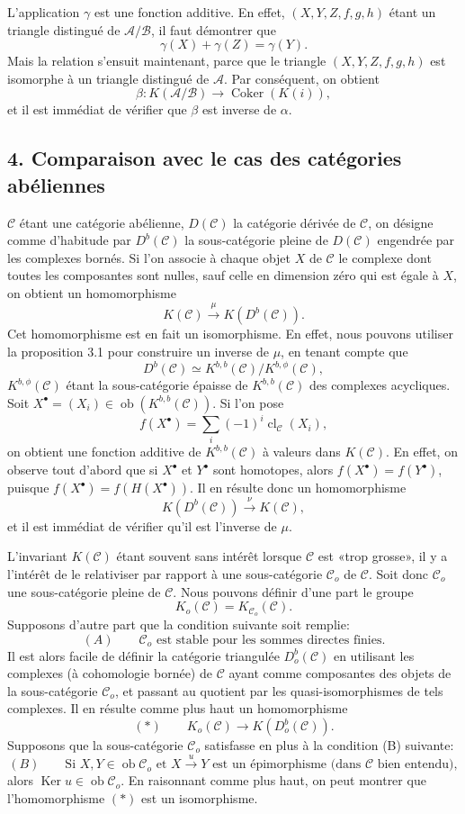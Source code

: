 \documentclass[11pt]{article}
\providecommand{\Ob}{\operatorname{ob}}
\providecommand{\cC}{\mathcal C}
\providecommand{\Ob}{\operatorname{ob}}
\providecommand{\cC}{\mathcal C}
\providecommand{\cA}{\mathcal A}
\providecommand{\cB}{\mathcal B}
\providecommand{\Ob}{\operatorname{Ob}}
\providecommand{\Ob}{\operatorname{ob}}
\providecommand{\Ob}{\operatorname{Ob}}
\begin{document}
L'application $\gamma$ est une fonction additive. En effet, $(X,Y,Z,f,g,h)$ étant un triangle distingué de $\cA/\cB$, il faut démontrer que
\[
\gamma(X)+\gamma(Z)=\gamma(Y).
\]
Mais la relation s'ensuit maintenant, parce que le triangle $(X,Y,Z,f,g,h)$ est isomorphe à un triangle distingué de $\cA$. Par conséquent, on obtient
\[
\beta:K(\cA/\cB)\longrightarrow \operatorname{Coker}(K(i)),
\]
et il est immédiat de vérifier que $\beta$ est inverse de $\alpha$.

\subsection*{4. Comparaison avec le cas des catégories abéliennes}

$\cC$ étant une catégorie abélienne, $D(\cC)$ la catégorie dérivée de $\cC$, on désigne comme d'habitude par $D^b(\cC)$ la sous-catégorie pleine de $D(\cC)$ engendrée par les complexes bornés. Si l'on associe à chaque objet $X$ de $\cC$ le complexe dont toutes les composantes sont nulles, sauf celle en dimension zéro qui est égale à $X$, on obtient un homomorphisme
\[
K(\cC)\xrightarrow{\mu}K(D^b(\cC)).
\]
Cet homomorphisme est en fait un isomorphisme. En effet, nous pouvons utiliser la proposition 3.1 pour construire un inverse de $\mu$, en tenant compte que
\[
D^b(\cC)\simeq K^{b,b}(\cC)/K^{b,\phi}(\cC),
\]
$K^{b,\phi}(\cC)$ étant la sous-catégorie épaisse de $K^{b,b}(\cC)$ des complexes acycliques. Soit $X^\bullet=(X_i)\in\Ob(K^{b,b}(\cC))$. Si l'on pose
\[
f(X^\bullet)=\sum_i(-1)^i\operatorname{cl}_{\cC}(X_i),
\]
on obtient une fonction additive de $K^{b,b}(\cC)$ à valeurs dans $K(\cC)$. En effet, on observe tout d'abord que si $X^\bullet$ et $Y^\bullet$ sont homotopes, alors $f(X^\bullet)=f(Y^\bullet)$, puisque $f(X^\bullet)=f(H(X^\bullet))$. Il en résulte donc un homomorphisme
\[
K(D^b(\cC))\xrightarrow{\nu}K(\cC),
\]
et il est immédiat de vérifier qu'il est l'inverse de $\mu$.

L'invariant $K(\cC)$ étant souvent sans intérêt lorsque $\cC$ est «trop grosse», il y a l'intérêt de le relativiser par rapport à une sous-catégorie $\cC_o$ de $\cC$. Soit donc $\cC_o$ une sous-catégorie pleine de $\cC$. Nous pouvons définir d'une part le groupe
\[
K_o(\cC)=K_{\cC_o}(\cC).
\]
Supposons d'autre part que la condition suivante soit remplie:
\[
(A)\qquad \cC_o\text{ est stable pour les sommes directes finies.}
\]
Il est alors facile de définir la catégorie triangulée $D_o^b(\cC)$ en utilisant les complexes (à cohomologie bornée) de $\cC$ ayant comme composantes des objets de la sous-catégorie $\cC_o$, et passant au quotient par les quasi-isomorphismes de tels complexes. Il en résulte comme plus haut un homomorphisme
\[
(*)\qquad K_o(\cC)\longrightarrow K(D_o^b(\cC)).
\]
Supposons que la sous-catégorie $\cC_o$ satisfasse en plus à la condition (B) suivante:
\[
(B)\qquad
\text{Si }X,Y\in\Ob\cC_o\text{ et }X\xrightarrow{u}Y
\text{ est un épimorphisme (dans }\cC\text{ bien entendu)},
\]
alors $\operatorname{Ker}u\in\Ob\cC_o$. En raisonnant comme plus haut, on peut montrer que l'homomorphisme $(*)$ est un isomorphisme.
\end{document}
